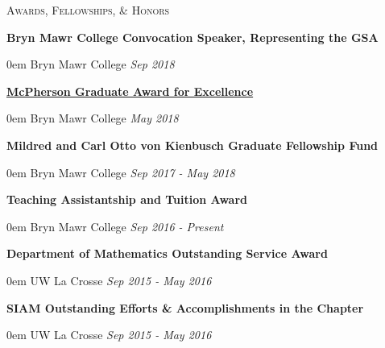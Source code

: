 \documentclass[11pt]{article}
\newenvironment{headitem}[2]{\vskip5pt \hspace{.5em} \textbf{#1} \hfill #2 \begin{addmargin}[0em]{0em}}{\end{addmargin}}
\renewenvironment{section}[1]{\textsc{\large #1}}{\vskip10pt}
\newcommand{\itemdate}[2]{\hspace{.5em} #1 \hfill \textit{#2} \\}
\begin{document}
\begin{section}{Awards, Fellowships, \& Honors}

	\begin{headitem}{Bryn Mawr College Convocation Speaker, Representing the GSA}{}
		\itemdate{Bryn Mawr College}{Sep 2018}
	\end{headitem}
	
	\begin{headitem}{\href{https://www.brynmawr.edu/president/mcpherson-award-excellence}{McPherson Graduate Award for Excellence}}{}
		\itemdate{Bryn Mawr College}{May 2018}
	\end{headitem}
	
	\begin{headitem}{Mildred and Carl Otto von Kienbusch Graduate Fellowship Fund}{}
		\itemdate{Bryn Mawr College}{Sep 2017 - May 2018}
	\end{headitem}
	
	\begin{headitem}{Teaching Assistantship and Tuition Award}{}
		\itemdate{Bryn Mawr College}{Sep 2016 - Present}
	\end{headitem}
	
	\begin{headitem}{Department of Mathematics Outstanding Service Award}{}
		\itemdate{UW La Crosse}{Sep 2015 - May 2016}
	\end{headitem}
	
	\begin{headitem}{SIAM Outstanding Efforts \& Accomplishments in the Chapter}{}
		\itemdate{UW La Crosse}{Sep 2015 - May 2016}
	\end{headitem}
	
\end{section}



%	
%	

		
\end{document}
